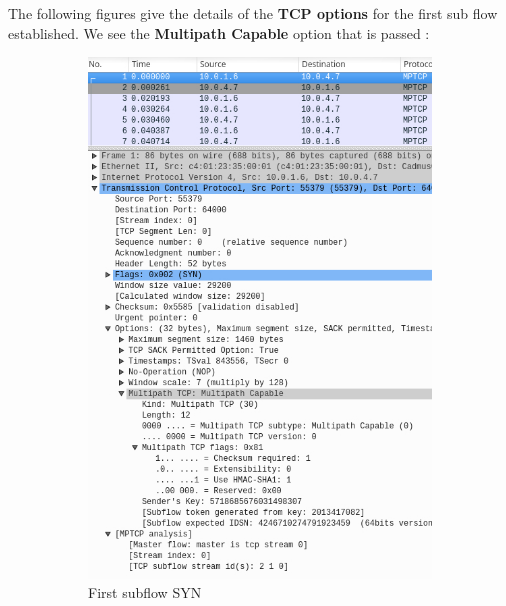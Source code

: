 \documentclass[a4paper,11pt]{article}
\begin{document}
			The following figures give the details of the \textbf{TCP options} for the first sub flow established. We see the \textbf{Multipath Capable} option that is passed :

			
			\begin{figure}[h!]
			\centering
			\label{fig:firstsubflow}
			\begin{subfigure}{.5\textwidth}
			  \centering
			  \label{fig:firstflow}
			  \includegraphics[width=0.8\linewidth]{pictures/firstflow.jpg}
			  \caption{First subflow SYN}
			\end{subfigure}%
			\begin{subfigure}{.5\textwidth}
			  \centering
			  \label{fig:firstflowresponse}

\end{subfigure}
\end{figure}
\end{document}
